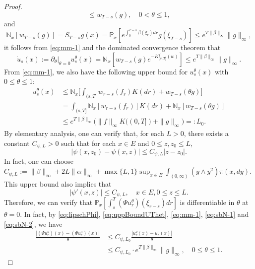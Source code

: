 \documentclass[UTF8]{pkuthss}
\theoremstyle{plain}
\theoremstyle{definition}
\numberwithin{equation}{section}
\begin{document}
\begin{proof}
\begin{equation}
	\leq w_{T-s}(g),
	\quad 0 < \theta \leq 1,
\end{equation}
	and
\begin{equation}
\label{eq:sbN-2}
	\mathbb N_x[w_{T-s}(g)]
	= S_{T-s} g (x)
	= \mathbb P_x[e^{\int_0^{T-s} \beta(\xi_r) dr} g(\xi_{T-s})]
	\leq e^{T \|\beta\|_\infty} \|g\|_\infty,
\end{equation}
	it follows from \eqref{eq:mm-1} and the dominated convergence theorem that
\begin{equation}
\label{eq:mm-3}
	\dot u_s(x)
	:= \partial_\theta|_{\theta=0} u_s^\theta(x)
	= \mathbb N_x[w_{T-s}(g) e^{-K^f_{(s,T]}(w)}]
	\leq e^{T \|\beta\|_\infty} \|g\|_\infty.
\end{equation}
	From \eqref{eq:mm-1}, we also have the following upper bound for $u_s^\theta (x)$ with $0 \leq \theta \leq 1$:
\begin{equation}\label{eq:uppBoundUThet}\begin{split}
	u_s^\theta(x)
	&\leq \mathbb N_x \Big[\int_{(s,T]} w_{r-s}(f_r) K(dr) + w_{T-s}(\theta g)\Big]\\
	&= \int_{(s,T]} \mathbb N_x[w_{r-s}(f_r)] K(dr ) + \mathbb N_x[w_{T-s}(\theta g)]\\
	&\leq e^{T\|\beta\|_\infty} \big( \|f\|_\infty K((0,T])+\|g\|_\infty \big)
	= : L_0.
\end{split}\end{equation}
	By elementary analysis, one can verify that, for each $L>0$, there exists a constant $C_{\psi,L}>0$ such that for each $x\in E$ and $0\leq z, z_0 \leq L$,
\begin{equation}\label{eq:lipschPhi}
	|\psi(x,z_0) - \psi(x,z)|
	\leq C_{\psi,L} |z - z_0|.
\end{equation}
	In fact, one can choose
	$C_{\psi,L} 
	:= \|\beta\|_\infty + 2L\|\alpha\|_\infty + \max\{L,1\} \sup_{x\in E} \int_{(0,\infty)} (y \wedge y^2) \pi(x,dy)$.
	This upper bound also implies that
\[
	|\psi' (x,z)|
	\leq C_{\psi,L},
	\quad x \in E, 0 \leq z \leq L.
\]
	Therefore, we can verify that  
$\mathbb P_x[\int_s^T (\Psi u^\theta_r)(\xi_{r-s}) dr]$ 
	is differentiable in $\theta$ at $\theta = 0$.
	In fact, by \eqref{eq:lipschPhi}, \eqref{eq:uppBoundUThet}, \eqref{eq:mm-1}, \eqref{eq:sbN-1} and \eqref{eq:sbN-2}, we have
\[\begin{split}
	\frac {|(\Psi u_r^\theta)(x)- (\Psi u^0_r)(x)|} {\theta}
	&\leq C_{\psi,L_0} \frac {|u_r^\theta(x) - u_r^0(x)|} {\theta}\\
	&\leq C_{\psi,L_0} \cdot e^{T \|\beta\|_\infty} \|g\|_\infty,
	\quad 0 \leq \theta \leq 1.

\end{split}\]
\end{proof}
\end{document}
